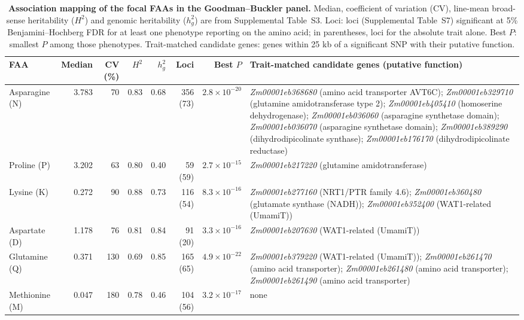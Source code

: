 \documentclass[namedate,unnumsec,webpdf,contemporary,large]{oup-authoring-template}
\begin{document}

\begin{table}[t]
\centering
\caption{\textbf{Association mapping of the focal FAAs in the Goodman--Buckler panel.} Median, coefficient of variation (CV), line-mean broad-sense heritability ($H^2$) and genomic heritability ($h^2_g$) are from Supplemental Table~S3. Loci: loci (Supplemental Table~S7) significant at 5\% Benjamini--Hochberg FDR for at least one phenotype reporting on the amino acid; in parentheses, loci for the absolute trait alone. Best $P$: smallest $P$ among those phenotypes. Trait-matched candidate genes: genes within 25 kb of a significant SNP with their putative function.}
\label{tab:amino_gwas_focus}
\footnotesize
\setlength{\tabcolsep}{3pt}
\begin{tabularx}{\textwidth}{@{}l r r r r r r >{\raggedright\arraybackslash}X@{}}
\hline
FAA & Median & CV (\%) & $H^2$ & $h^2_g$ & Loci & Best $P$ & Trait-matched candidate genes (putative function) \\
\hline
Asparagine (N) & 3.783 & 70 & 0.83 & 0.68 & 356 (73) & $2.8\times10^{-20}$ & \textit{Zm00001eb368680} (amino acid transporter AVT6C); \textit{Zm00001eb329710} (glutamine amidotransferase type 2); \textit{Zm00001eb405410} (homoserine dehydrogenase); \textit{Zm00001eb036060} (asparagine synthetase domain); \textit{Zm00001eb036070} (asparagine synthetase domain); \textit{Zm00001eb389290} (dihydrodipicolinate synthase); \textit{Zm00001eb176170} (dihydrodipicolinate reductase) \\
Proline (P) & 3.202 & 63 & 0.80 & 0.40 & 59 (59) & $2.7\times10^{-15}$ & \textit{Zm00001eb217220} (glutamine amidotransferase) \\
Lysine (K) & 0.272 & 90 & 0.88 & 0.73 & 116 (54) & $8.3\times10^{-16}$ & \textit{Zm00001eb277160} (NRT1/PTR family 4.6); \textit{Zm00001eb360480} (glutamate synthase (NADH)); \textit{Zm00001eb352400} (WAT1-related (UmamiT)) \\
Aspartate (D) & 1.178 & 76 & 0.81 & 0.84 & 91 (20) & $3.3\times10^{-16}$ & \textit{Zm00001eb207630} (WAT1-related (UmamiT)) \\
Glutamine (Q) & 0.371 & 130 & 0.69 & 0.85 & 165 (65) & $4.9\times10^{-22}$ & \textit{Zm00001eb379220} (WAT1-related (UmamiT)); \textit{Zm00001eb261470} (amino acid transporter); \textit{Zm00001eb261480} (amino acid transporter); \textit{Zm00001eb261490} (amino acid transporter) \\
Methionine (M) & 0.047 & 180 & 0.78 & 0.46 & 104 (56) & $3.2\times10^{-17}$ & none \\
\hline
\end{tabularx}
\end{table}
\end{document}
